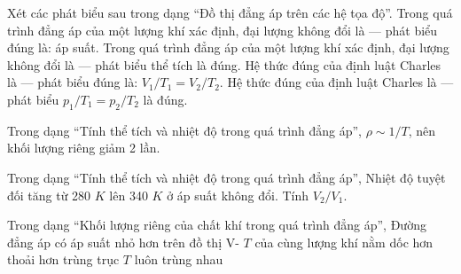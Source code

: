 \begin{ex}
Xét các phát biểu sau trong dạng “Đồ thị đẳng áp trên các hệ tọa độ”.
\choiceTF
{\True Trong quá trình đẳng áp của một lượng khí xác định, đại lượng không đổi là — phát biểu đúng là: áp suất.}
{Trong quá trình đẳng áp của một lượng khí xác định, đại lượng không đổi là — phát biểu thể tích là đúng.}
{\True Hệ thức đúng của định luật Charles là — phát biểu đúng là: $V_1/T_1=V_2/T_2$.}
{Hệ thức đúng của định luật Charles là — phát biểu $p_1/T_1=p_2/T_2$ là đúng.}
\end{ex}

\begin{bt}
Trong dạng “Tính thể tích và nhiệt độ trong quá trình đẳng áp”, $\rho\sim1/T$, nên khối lượng riêng giảm 2 lần.
\end{bt}

\begin{ex}
Trong dạng “Tính thể tích và nhiệt độ trong quá trình đẳng áp”, Nhiệt độ tuyệt đối tăng từ 280 $K$ lên 340 $K$ ở áp suất không đổi. Tính $V_2/V_1$.
\end{ex}

\begin{ex}
Trong dạng “Khối lượng riêng của chất khí trong quá trình đẳng áp”, Đường đẳng áp có áp suất nhỏ hơn trên đồ thị V- $T$ của cùng lượng khí nằm
\choice
{\True dốc hơn}
{thoải hơn}
{trùng trục $T$}
{luôn trùng nhau}
\end{ex}

